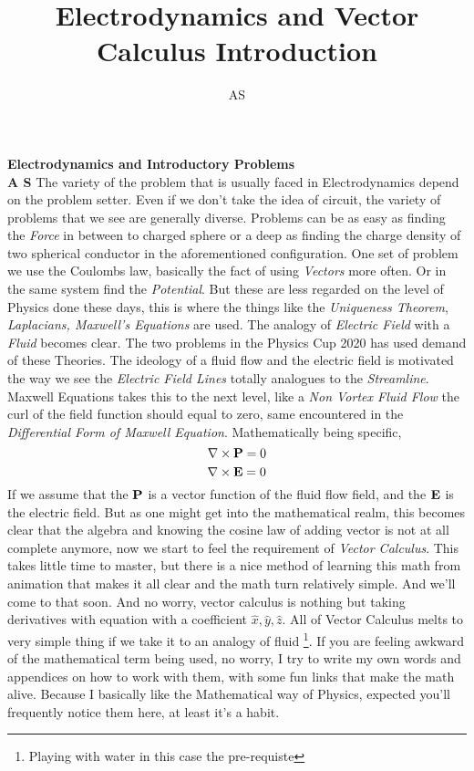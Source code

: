 \documentclass[11pt,a4paper,twocolumn]{article}
\author{AS}
\title{Electrodynamics and Vector Calculus Introduction}
\theoremstyle{definition}
\theoremstyle{definition}
\theoremstyle{definition}
\theoremstyle{definition}
\begin{document}
\textsf{\textbf{Electrodynamics and Introductory Problems }}\\
\textsf{\textbf{A S}}
The variety of the problem that is usually faced in Electrodynamics depend on the problem setter. Even if we don’t take the idea of circuit, the variety of problems that we see are generally diverse.
Problems can be as easy as finding the \emph{Force} in between to charged sphere or a deep as finding the charge density of two spherical conductor in the aforementioned configuration. One set of problem we use the Coulombs law, basically the fact of using \emph{Vectors} more often. Or in the same system find the \emph{Potential}. But these are less regarded on the level of Physics done these days, this is where the things like the \emph{Uniqueness Theorem}, \emph{Laplacians, Maxwell’s Equations} are used. The analogy of \emph{Electric Field} with a \emph{Fluid} becomes clear. The two problems in the Physics Cup 2020 has used demand of these Theories.
The ideology of a fluid flow and the electric field is motivated the way we see the \emph{Electric Field Lines} totally analogues to the \emph{Streamline}. Maxwell Equations takes this to the next level, like a \emph{Non Vortex Fluid Flow} the curl of the field function should equal to zero, same encountered in the \emph{Differential Form of Maxwell Equation}. Mathematically being specific,
\begin{equation}
\nabla \times \text{\textbf{P}} = 0
\end{equation}
\begin{equation}
\nabla \times \text{\textbf{E}} = 0
\end{equation}
If we assume that the $\text{\textbf{P}}$ is a vector function of the fluid flow field, and the $\text{\textbf{E}}$ is the electric field. 
But as one might get into the mathematical realm, this becomes clear that the algebra and knowing the cosine law of adding vector is not at all complete anymore, now we start to feel the requirement of \emph{Vector Calculus}. This takes little time to master, but there is a nice method of learning this math from animation that makes it all clear and the math turn relatively simple. And we’ll come to that soon. And no worry, vector calculus is nothing but taking derivatives with equation with a coefficient $ \hat{x}, \hat{y}, \hat{z}$. All of Vector Calculus melts to very simple thing if we take it to an analogy of fluid \footnote{Playing with water in this case the pre-requiste}.
If you are feeling awkward of the mathematical term being used, no worry, I try to write my own words and appendices on how to work with them, with some fun links that make the math alive.  Because I basically like the Mathematical way of Physics, expected you’ll frequently notice them here, at least it’s a habit.
\end{document}
